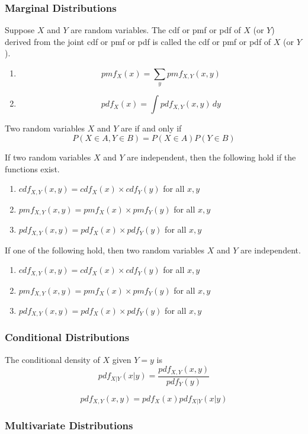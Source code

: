 \documentclass[11pt]{article}
\begin{document}
\subsubsection{Marginal Distributions}
Suppose $X$ and $Y$ are random variables. The cdf or pmf or pdf of $X$ (or $Y$) derived from the joint cdf or pmf or pdf is called the  cdf or pmf or pdf of $X$ (or $Y$).

\theorem
\begin{enumerate}
	\item $$pmf_X(x) = \sum_y pmf_{X,Y}(x,y)$$
	\item $$pdf_X(x) = \int pdf_{X,Y}(x,y)\, dy$$
\end{enumerate}

Two random variables $X$ and $Y$ are  if and only if 
$$P(X \in A, Y \in B) = P(X \in A)P(Y \in B)$$

\theorem
If two random variables $X$ and $Y$ are independent, then the following hold if the functions exist.
\begin{enumerate}
	\item $cdf_{X,Y}(x,y) = cdf_X(x) \times cdf_Y(y)$ for all $x,y$
	\item $pmf_{X,Y}(x,y) = pmf_X(x) \times pmf_Y(y)$ for all $x,y$
	\item $pdf_{X,Y}(x,y) = pdf_X(x) \times pdf_Y(y)$ for all $x,y$
\end{enumerate}

\theorem
If one of the following hold, then two random variables $X$ and $Y$ are independent.
\begin{enumerate}
	\item $cdf_{X,Y}(x,y) = cdf_X(x) \times cdf_Y(y)$ for all $x,y$
	\item $pmf_{X,Y}(x,y) = pmf_X(x) \times pmf_Y(y)$ for all $x,y$
	\item $pdf_{X,Y}(x,y) = pdf_X(x) \times pdf_Y(y)$ for all $x,y$
\end{enumerate}

\subsubsection{Conditional Distributions}
The conditional density of $X$ given $Y=y$ is
$$pdf_{X|Y}(x|y) = \frac{pdf_{X,Y}(x,y)}{pdf_Y(y)}$$

\theorem
$$pdf_{X,Y}(x,y) = pdf_X(x)pdf_{X|Y}(x|y)$$
\subsubsection{Multivariate Distributions}
\end{document}
